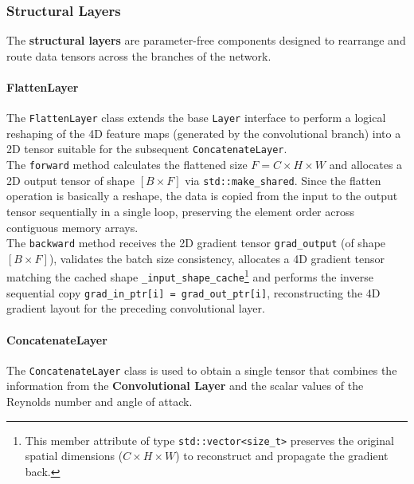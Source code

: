 \subsubsection{Structural Layers}

The \textbf{structural layers} are parameter-free components designed to rearrange and route data tensors across the branches of the network.

\paragraph{FlattenLayer}

The \texttt{FlattenLayer} class extends the base \texttt{Layer} interface to perform a logical reshaping of the 4D feature maps (generated by the convolutional branch) into a 2D tensor suitable for the subsequent \texttt{ConcatenateLayer}.\\

The \texttt{forward} method calculates the flattened size $F = C \times H \times W$ and allocates a 2D output tensor of shape $[B \times F]$ via \texttt{std::make\_shared}. Since the flatten operation is basically a reshape, the data is copied from the input to the output tensor sequentially in a single loop, preserving the element order across contiguous memory arrays.\\

The \texttt{backward} method receives the 2D gradient tensor \texttt{grad\_output} (of shape $[B \times F]$), validates the batch size consistency, allocates a 4D gradient tensor matching the cached shape \texttt{\_input\_shape\_cache}\footnote{This member attribute of type \texttt{std::vector<size\_t>} preserves the original spatial dimensions ($C \times H \times W$) to reconstruct and propagate the gradient back.} and performs the inverse sequential copy \texttt{grad\_in\_ptr[i] = grad\_out\_ptr[i]}, reconstructing the 4D gradient layout for the preceding convolutional layer.

\paragraph{ConcatenateLayer}

The \texttt{ConcatenateLayer} class is used to obtain a single tensor that combines the information from the \textbf{Convolutional Layer} and the scalar values of the Reynolds number and angle of attack.\\

